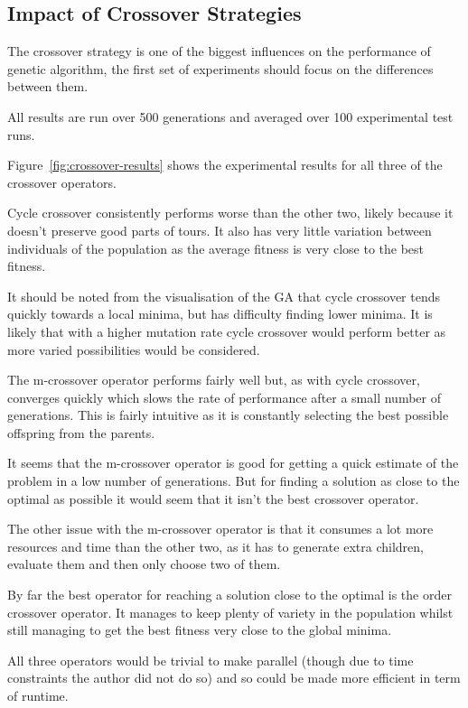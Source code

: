 \documentclass[10pt, a4paper]{article}
\begin{document}
\subsection{Impact of Crossover Strategies}
The crossover strategy is one of the biggest influences on the performance of
genetic algorithm, the first set of experiments should focus on the differences
between them.

All results are run over 500 generations and averaged over 100 experimental 
test runs.

Figure~\ref{fig:crossover-results} shows the experimental results for all three
of the crossover operators.

Cycle crossover consistently performs worse than the other two, likely because
it doesn't preserve good parts of tours. It also has very little variation
between individuals of the population as the average fitness is very close to
the best fitness.

It should be noted from the visualisation of the GA that cycle crossover tends
quickly towards a local minima, but has difficulty finding lower minima. It is
likely that with a higher mutation rate cycle crossover would perform better as
more varied possibilities would be considered.

The m-crossover operator performs fairly well but, as with cycle crossover,
converges quickly which slows the rate of performance after a small number of
generations. This is fairly intuitive as it is constantly selecting the best
possible offspring from the parents.

It seems that the m-crossover operator is good for getting a quick estimate of
the problem in a low number of generations. But for finding a solution as close
to the optimal as possible it would seem that it isn't the best crossover
operator. %

The other issue with the m-crossover operator is that it consumes a lot more
resources and time than the other two, as it has to generate extra children,
evaluate them and then only choose two of them.

By far the best operator for reaching a solution close to the optimal is the
order crossover operator. It manages to keep plenty of variety in the 
population whilst still managing to get the best fitness very close to the
global minima.

All three operators would be trivial to make parallel (though due to time
constraints the author did not do so) and so could be made more efficient in
term of runtime.
\end{document}
